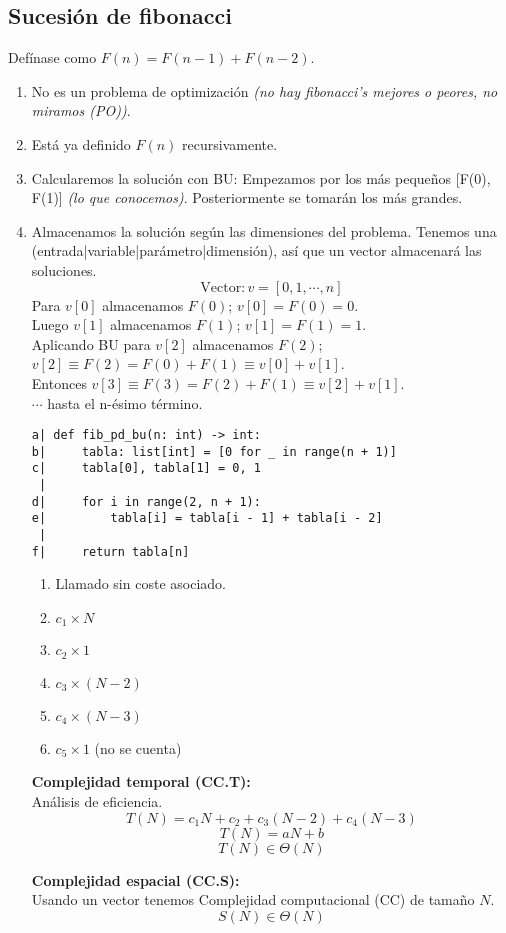\subsection{Sucesión de fibonacci}
\begin{example}
	Defínase como $F(n)=F(n-1)+F(n-2)$.
	\begin{enumerate}
		\item No es un problema de optimización \textit{(no hay fibonacci's mejores o peores, no miramos (PO))}.
		\item Está ya definido $F(n)$ recursivamente.
		\item Calcularemos la solución con BU:
		      Empezamos por los más pequeños [F(0), F(1)] \textit{(lo que conocemos)}. Posteriormente se tomarán los más grandes.
		\item Almacenamos la solución según las dimensiones del problema. Tenemos una (entrada|variable|parámetro|dimensión), así que un vector almacenará las soluciones.
		      $$\text{Vector}:v=[0, 1, \cdots,n]$$
		      Para $v[0]$ almacenamos $F(0)$; $v[0]=F(0)=0$.\\
		      Luego $v[1]$ almacenamos $F(1)$; $v[1]=F(1)=1$.\\
		      Aplicando BU para $v[2]$ almacenamos $F(2)$; $v[2]\equiv F(2)=F(0)+F(1)\equiv v[0]+v[1]$.\\
		      Entonces $v[3]\equiv F(3)=F(2)+F(1)\equiv v[2]+v[1]$.\\
		      $\cdots$ hasta el n-ésimo término.

		      \begin{multicols}{2}
			      \begin{lstlisting}
a| def fib_pd_bu(n: int) -> int:
b|     tabla: list[int] = [0 for _ in range(n + 1)]
c|     tabla[0], tabla[1] = 0, 1
 | 
d|     for i in range(2, n + 1):
e|         tabla[i] = tabla[i - 1] + tabla[i - 2]
 | 
f|     return tabla[n]
\end{lstlisting}
			      \columnbreak
			      \begin{enumerate}
				      \item Llamado sin coste asociado.
				      \item $c_1\times N$
				      \item $c_2\times1$
				      \item $c_3\times (N-2)$
				      \item $c_4\times (N-3)$
				      \item $c_5\times1$ (no se cuenta)
			      \end{enumerate}
		      \end{multicols}

		      \textbf{Complejidad temporal (CC.T):\\}
		      Análisis de eficiencia.
		      $$ T(N)=c_1N+c_2+c_3(N-2)+c_4(N-3) $$
		      $$ T(N)=aN+b $$
		      $$ T(N)\in \Theta(N) $$

		      \textbf{Complejidad espacial (CC.S):\\}
		      Usando un vector tenemos Complejidad computacional (CC) de tamaño $N$.
		      $$ S(N)\in\Theta(N) $$
	\end{enumerate}
\end{example}

